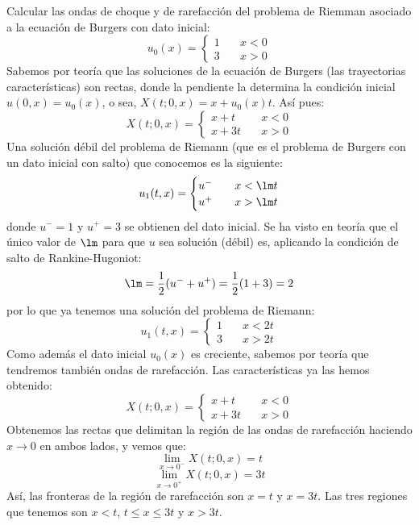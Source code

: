 \documentclass[12pt]{article}
\begin{document}
    \begin{ejercicio}
        Calcular las ondas de choque y de rarefacción del problema de Riemman asociado a la ecuación de Burgers con dato inicial:
        $$u_0(x) = \begin{cases}
            1 \quad& x<0 \\
            3 \quad& x>0
        \end{cases}$$
        Sabemos por teoría que las soluciones de la ecuación de Burgers (las trayectorias características) son rectas,
        donde la pendiente la determina la condición inicial $u(0,x) = u_0(x)$, o sea, $X(t;0,x) = x + u_0(x)t$. Así pues:
        $$X(t;0,x) = \begin{cases}
            x + t \quad& x < 0 \\
            x + 3t \quad& x > 0
        \end{cases}$$
        Una solución débil del problema de Riemann (que es el problema de Burgers con un dato inicial con salto) que conocemos es la siguiente:
        $$u_1(t,x) = \begin{cases}
            u^{-} \quad& x < \lm t \\
            u^{+} \quad& x > \lm t
        \end{cases}$$
        donde $u^{-} = 1$ y $u^{+} = 3$ se obtienen del dato inicial. Se ha visto en teoría que el único valor de $\lm$ para 
        que $u$ sea solución (débil) es, aplicando la condición de salto de Rankine-Hugoniot:
        $$\lm = \dfrac{1}{2}(u^{-} + u^{+}) = \dfrac{1}{2}(1+3) = 2$$
        por lo que ya tenemos una solución del problema de Riemann: 
        $$\boxed{u_1(t,x) = \begin{cases}
            1 \quad& x < 2t \\
            3 \quad& x > 2t
        \end{cases}}$$
        Como además el dato inicial $u_0(x)$ es creciente, sabemos por teoría que tendremos también ondas de rarefacción. Las características ya
        las hemos obtenido:
        $$X(t;0,x) = \begin{cases}
            x + t \quad& x < 0 \\
            x + 3t \quad& x > 0
        \end{cases}$$
        Obtenemos las rectas que delimitan la región de las ondas de rarefacción haciendo $x \to 0$ en ambos lados, y vemos que:
        $$\lim\limits_{x \to 0^{-}}X(t;0,x) = t$$
        $$\lim\limits_{x \to 0^{+}}X(t;0,x) = 3t$$
        Así, las fronteras de la región de rarefacción son $x = t$ y $x=3t$. Las tres regiones que tenemos son $x < t$, $t \leq x \leq 3t$ y $x > 3t$.

\end{ejercicio}
\end{document}
